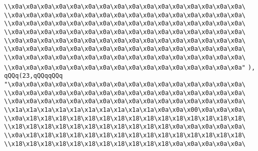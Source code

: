 \verb|\\x0a\x0a\x0a\x0a\x0a\x0a\x0a\x0a\x0a\x0a\x0a\x0a\x0a\x0a\x0a\x0a\|\newline
\verb|\\x0a\x0a\x0a\x0a\x0a\x0a\x0a\x0a\x0a\x0a\x0a\x0a\x0a\x0a\x0a\x0a\|\newline
\verb|\\x0a\x0a\x0a\x0a\x0a\x0a\x0a\x0a\x0a\x0a\x0a\x0a\x0a\x0a\x0a\x0a\|\newline
\verb|\\x0a\x0a\x0a\x0a\x0a\x0a\x0a\x0a\x0a\x0a\x0a\x0a\x0a\x0a\x0a\x0a\|\newline
\verb|\\x0a\x0a\x0a\x0a\x0a\x0a\x0a\x0a\x0a\x0a\x0a\x0a\x0a\x0a\x0a\x0a\|\newline
\verb|\\x0a\x0a\x0a\x0a\x0a\x0a\x0a\x0a\x0a\x0a\x0a\x0a\x0a\x0a\x0a\x0a\|\newline
\verb|\\x0a\x0a\x0a\x0a\x0a\x0a\x0a\x0a\x0a\x0a\x0a\x0a\x0a\x0a\x0a\x0a\|\newline
\verb|\\x0a\x0a\x0a\x0a\x0a\x0a\x0a\x0a\x0a\x0a\x0a\x0a\x0a\x0a\x0a\x0a"|\newline
\verb|),|\newline
\verb|qQQq(23,qQQqqQQq|\newline
\verb|"\x0a\x0a\x0a\x0a\x0a\x0a\x0a\x0a\x0a\x0a\x0a\x0a\x0a\x0a\x0a\x0a\|\newline
\verb|\\x0a\x0a\x0a\x0a\x0a\x0a\x0a\x0a\x0a\x0a\x0a\x0a\x0a\x0a\x0a\x0a\|\newline
\verb|\\x0a\x0a\x0a\x0a\x0a\x0a\x0a\x0a\x0a\x0a\x0a\x0a\x0a\x0a\x0a\x0a\|\newline
\verb|\\x1a\x1a\x1a\x1a\x1a\x1a\x1a\x1a\x1a\x1a\x0a\x0a\x00\x0a\x0a\x0a\|\newline
\verb|\\x0a\x18\x18\x18\x18\x18\x18\x18\x18\x18\x18\x18\x18\x18\x18\x18\|\newline
\verb|\\x18\x18\x18\x18\x18\x18\x18\x18\x18\x18\x18\x0a\x0a\x0a\x0a\x0a\|\newline
\verb|\\x0a\x18\x18\x18\x18\x18\x18\x18\x18\x18\x18\x18\x18\x18\x18\x18\|\newline
\verb|\\x18\x18\x18\x18\x18\x18\x18\x18\x18\x18\x18\x0a\x0a\x0a\x0a\x0a\|\newline
